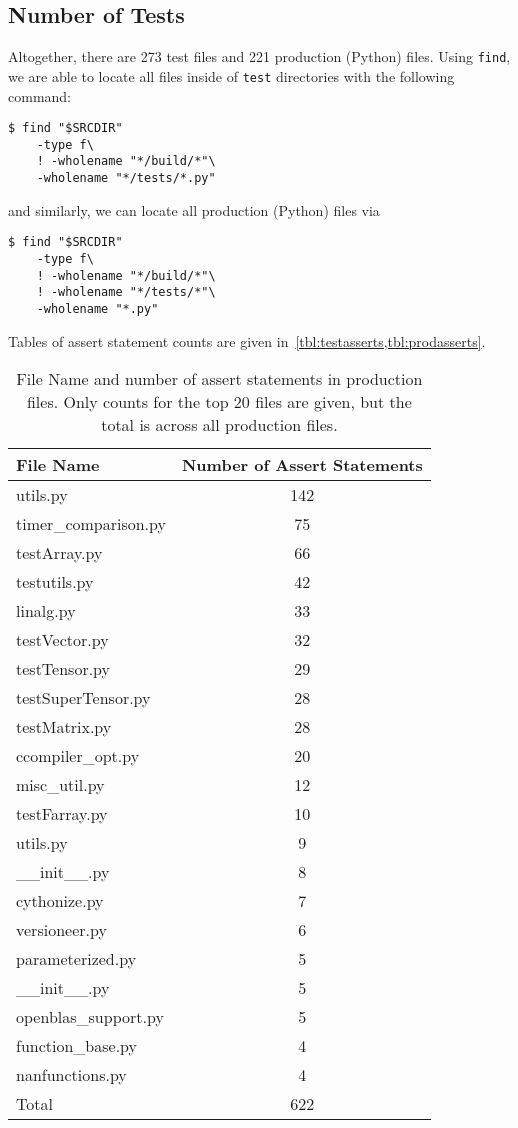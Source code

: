 \documentclass{article}
\begin{document}
\subsection{Number of Tests}
Altogether, there are 273 test files and 221 production (Python) files. Using \texttt{find}, we are able to locate all files inside of
\texttt{test} directories with the following command:
\begin{verbatim}
$ find "$SRCDIR" 
    -type f\
    ! -wholename "*/build/*"\
    -wholename "*/tests/*.py"
\end{verbatim}
and similarly, we can locate all production (Python) files via
\begin{verbatim}
$ find "$SRCDIR"
    -type f\
    ! -wholename "*/build/*"\
    ! -wholename "*/tests/*"\
    -wholename "*.py"
\end{verbatim}
Tables of assert statement counts are given in~\cref{tbl:testasserts,tbl:prodasserts}.
\begin{table}[H]
    \centering
    \begin{tabular}{lc}
        File Name & Number of Assert Statements\\\toprule
        utils.py & 142\\
        timer\_comparison.py & 75\\
        testArray.py & 66\\
        testutils.py & 42\\
        linalg.py & 33\\
        testVector.py & 32\\
        testTensor.py & 29\\
        testSuperTensor.py & 28\\
        testMatrix.py & 28\\
        ccompiler\_opt.py & 20\\
        misc\_util.py & 12\\
        testFarray.py & 10\\
        utils.py & 9\\
        \_\_init\_\_.py & 8\\
        cythonize.py & 7\\
        versioneer.py & 6\\
        parameterized.py & 5\\
        \_\_init\_\_.py & 5\\
        openblas\_support.py & 5\\
        function\_base.py & 4\\
        nanfunctions.py & 4\\\bottomrule
        Total & 622
    \end{tabular}
        \caption{File Name and number of assert statements in production files. Only counts for the top 20 files are given, but the total is across all production files.}
    \label{tbl:prodasserts}
\end{table}
\end{document}
